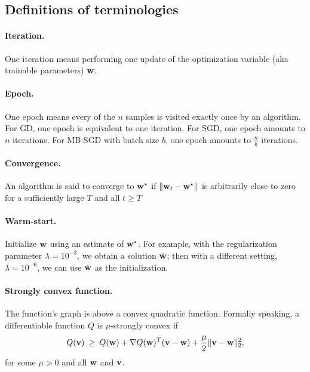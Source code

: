 \documentclass[11pt]{article}
\numberwithin{equation}{section}
\def\v{{\bf v}}
\def\w{{\bf w}}
\begin{document}
\subsection{Definitions of terminologies} \label{sec:alg:terminologies}



\paragraph{Iteration.}
One iteration means performing one update of the optimization variable (aka trainable parameters) $\w$.

\paragraph{Epoch.}
One epoch means every of the $n$ samples is visited exactly once by an algorithm.
For GD, one epoch is equivalent to one iteration.
For SGD, one epoch amounts to $n$ iterations.
For MB-SGD with batch size $b$, one epoch amounts to $\frac{n}{b}$ iterations.


\paragraph{Convergence.}
An algorithm is said to converge to $\w^\star$ 
if $\| \w_t - \w^\star \|$ is arbitrarily close to zero for a sufficiently large $T$ and all $t \geq T$


\paragraph{Warm-start.}
Initialize $\w$ using an estimate of $\w^\star$.
For example, with the regularization parameter $\lambda = 10^{-3}$, we obtain a solution $\tilde{\w}$;
then with a different setting, $\lambda = 10^{-6}$, we can use $\tilde{\w}$ as the initialization.



\paragraph{Strongly convex function.}
The function's graph is above a convex quadratic function.
Formally speaking, a differentiable function $Q$ is $\mu$-strongly convex if
\begin{equation*}
Q (\v ) \: \geq \: Q (\w ) + \nabla Q (\w)^T (\v - \w  ) + \frac{\mu }{2}\| \v - \w \|_2^2 ,
\end{equation*}
for some $\mu > 0$ and all $\w$ and $\v$.
\end{document}
